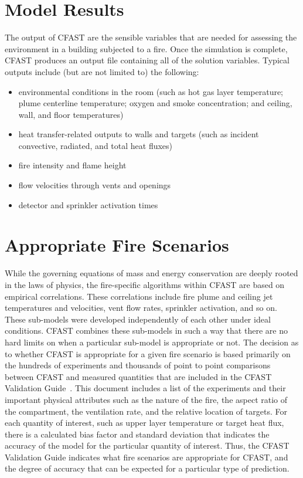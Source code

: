 \section{Model Results}

The output of CFAST are the sensible variables that are needed for assessing the environment in a building subjected to a fire. Once the simulation is complete, CFAST produces an output file containing all of the solution variables.  Typical outputs include (but are not limited to) the following:
\begin{itemize}
\item environmental conditions in the room (such as hot gas layer temperature; plume centerline temperature; oxygen and smoke concentration; and ceiling, wall, and floor temperatures)
\item heat transfer-related outputs to walls and targets (such as incident convective, radiated, and total heat fluxes)
\item fire intensity and flame height
\item flow velocities through vents and openings
\item detector and sprinkler activation times
\end{itemize}


\section{Appropriate Fire Scenarios}

While the governing equations of mass and energy conservation are deeply rooted in the laws of physics, the fire-specific algorithms within CFAST are based on empirical correlations. These correlations include fire plume and ceiling jet temperatures and velocities, vent flow rates, sprinkler activation, and so on. These sub-models were developed independently of each other under ideal conditions. CFAST combines these sub-models in such a way that there are no hard limits on when a particular sub-model is appropriate or not. The decision as to whether CFAST is appropriate for a given fire scenario is based primarily on the hundreds of experiments and thousands of point to point comparisons between CFAST and measured quantities that are included in the CFAST Validation Guide~\cite{CFAST_Valid_Guide_6}. This document includes a list of the experiments and their important physical attributes such as the nature of the fire, the aspect ratio of the compartment, the ventilation rate, and the relative location of targets. For each quantity of interest, such as upper layer temperature or target heat flux, there is a calculated bias factor and standard deviation that indicates the accuracy of the model for the particular quantity of interest. Thus, the CFAST Validation Guide indicates what fire scenarios are appropriate for CFAST, and the degree of accuracy that can be expected for a particular type of prediction.

